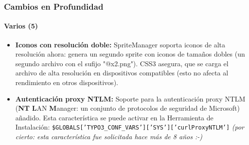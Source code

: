 \begin{frame}[fragile]
	\frametitle{Cambios en Profundidad}
	\framesubtitle{Varios (5)}

	\begin{itemize}

		\item \textbf{Iconos con resolución doble:}\newline
			\small
				SpriteManager soporta iconos de alta resolución ahora: genera un segundo sprite con iconos de tamaños dobles (un segundo archivo con el sufijo "@x2.png"). CSS3 asegura, que se carga el archivo de alta resolución en dispositivos compatibles\newline
				(esto no afecta al rendimiento en otros dispositivos).
			\normalsize

		\item \textbf{Autenticación proxy NTLM:}\newline
			\small
				Soporte para la autenticación proxy NTLM (\textbf{NT} \textbf{L}AN \textbf{M}anager: un conjunto de protocolos de seguridad de Microsoft) añadido. Esta característica se puede activar en la Herramienta de Instalación:\newline
			\normalsize
			\smaller
				\texttt{\$GLOBALS['TYPO3\_CONF\_VARS']['SYS']['curlProxyNTLM']}\newline
				\emph{(por cierto: esta característica fue solicitada hace más de 8 años :-)}
			\normalsize

	\end{itemize}

\end{frame}


